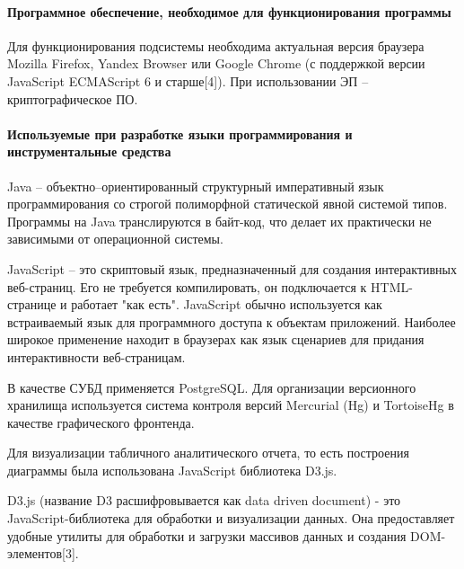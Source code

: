 \documentclass[a4paper]{extarticle}
\numberwithin{equation}{section}
\begin{document}
\paragraph{Программное обеспечение, необходимое для функционирования программы}
Для функционирования подсистемы необходима актуальная версия браузера Mozilla Firefox, Yandex Browser или Google Chrome (с поддержкой версии JavaScript ECMAScript 6 и старше[4]). При использовании ЭП – криптографическое ПО.

\paragraph{Используемые при разработке языки программирования и инструментальные средства}
Java – объектно–ориентированный структурный императивный язык программирования со строгой полиморфной статической явной системой типов. Программы на Java транслируются в байт-код, что делает их практически не зависимыми от операционной системы.\par
JavaScript – это скриптовый язык, предназначенный для создания интерактивных веб-страниц. Его не требуется компилировать, он подключается к HTML-странице и работает "как есть". JavaScript обычно используется как встраиваемый язык для программного доступа к объектам приложений. Наиболее широкое применение находит в браузерах как язык сценариев для придания интерактивности веб-страницам.\par
В качестве СУБД применяется PostgreSQL. Для организации версионного хранилища используется система контроля версий Mercurial (Hg) и TortoiseHg в качестве графического фронтенда.\par
Для визуализации табличного аналитического отчета, то есть построения диаграммы была использована JavaScript библиотека D3.js.\par
D3.js (название D3 расшифровывается как data driven document) - это JavaScript-библиотека для обработки и визуализации данных. Она предоставляет удобные утилиты для обработки и загрузки массивов данных и создания DOM-элементов[3].
\end{document}
